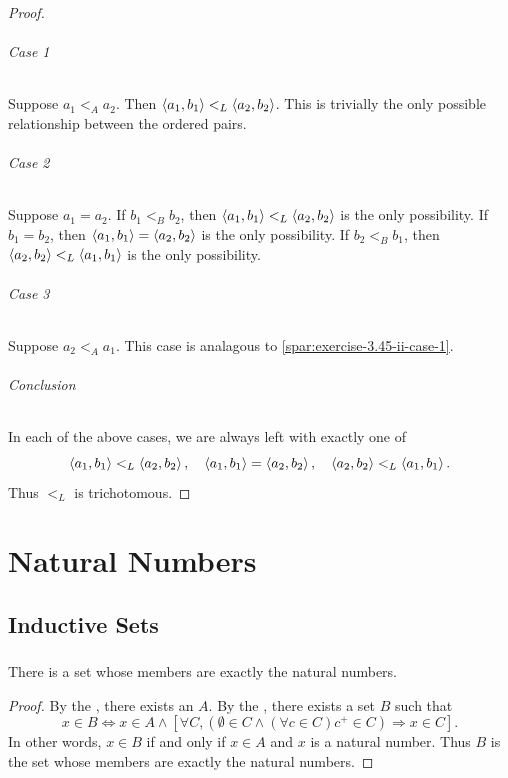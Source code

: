 \documentclass{report}
\begin{document}
\begin{proof}
      \subparagraph{Case 1}%

        Suppose $a_1 <_A a_2$.
        Then $\left< a_1, b_1 \right> <_L \left< a_2, b_2 \right>$.
        This is trivially the only possible relationship between the ordered
          pairs.

      \subparagraph{Case 2}%

        Suppose $a_1 = a_2$.
        If $b_1 <_B b_2$, then $\left< a_1, b_1 \right> <_L \left< a_2, b_2 \right>$ is the
          only possibility.
        If $b_1 = b_2$, then $\left< a_1, b_1 \right> = \left< a_2, b_2 \right>$ is the only
          possibility.
        If $b_2 <_B b_1$, then $\left< a_2, b_2 \right> <_L \left< a_1, b_1 \right>$ is the
          only possibility.

      \subparagraph{Case 3}%

        Suppose $a_2 <_A a_1$.
        This case is analagous to \eqref{spar:exercise-3.45-ii-case-1}.

      \subparagraph{Conclusion}%

        In each of the above cases, we are always left with exactly one of
          $$\left< a_1, b_1 \right> <_L \left< a_2, b_2 \right>, \quad
            \left< a_1, b_1 \right> = \left< a_2, b_2 \right>, \quad
            \left< a_2, b_2 \right> <_L \left< a_1, b_1 \right>.$$
        Thus $<_L$ is trichotomous.

  \end{proof}

\chapter{Natural Numbers}%

\section{Inductive Sets}%

\subsection{}%

  \begin{theorem}[4A]
    There is a set whose members are exactly the natural numbers.
  \end{theorem}

  \begin{proof}
    By the , there exists an
       $A$.
    By the , there exists a set $B$ such that
      $$x \in B \iff x \in A \land \left[\forall C,
        (\emptyset \in C \land
          (\forall c \in C) c^+ \in C) \Rightarrow x \in C\right].$$
    In other words, $x \in B$ if and only if $x \in A$ and $x$ is a natural
      number.
    Thus $B$ is the set whose members are exactly the natural numbers.
  \end{proof}
\end{document}
